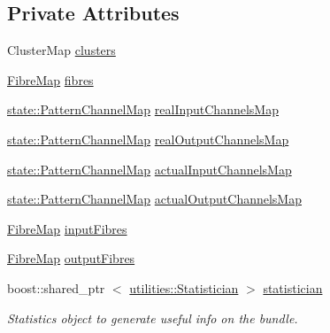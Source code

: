 \subsection*{\-Private \-Attributes}
\begin{DoxyCompactItemize}
\item 
\-Cluster\-Map \hyperlink{classcryomesh_1_1structures_1_1Bundle_a35a36d3305706f597f4c586fcd9f74b7}{clusters}
\item 
\hyperlink{classcryomesh_1_1structures_1_1FibreMap}{\-Fibre\-Map} \hyperlink{classcryomesh_1_1structures_1_1Bundle_a71b3308a867169b8e9af9ab71b8bdf98}{fibres}
\item 
\hyperlink{classcryomesh_1_1state_1_1PatternChannelMap}{state\-::\-Pattern\-Channel\-Map} \hyperlink{classcryomesh_1_1structures_1_1Bundle_ac9bd1c696001ef8acb7291a5f9e81c8b}{real\-Input\-Channels\-Map}
\item 
\hyperlink{classcryomesh_1_1state_1_1PatternChannelMap}{state\-::\-Pattern\-Channel\-Map} \hyperlink{classcryomesh_1_1structures_1_1Bundle_a4043d8bfeb8b066418029864f51d92de}{real\-Output\-Channels\-Map}
\item 
\hyperlink{classcryomesh_1_1state_1_1PatternChannelMap}{state\-::\-Pattern\-Channel\-Map} \hyperlink{classcryomesh_1_1structures_1_1Bundle_ae20b2f9819708971357148dd024db00d}{actual\-Input\-Channels\-Map}
\item 
\hyperlink{classcryomesh_1_1state_1_1PatternChannelMap}{state\-::\-Pattern\-Channel\-Map} \hyperlink{classcryomesh_1_1structures_1_1Bundle_ac67a6d7b29b37b8927c93350e8bcf6e5}{actual\-Output\-Channels\-Map}
\item 
\hyperlink{classcryomesh_1_1structures_1_1FibreMap}{\-Fibre\-Map} \hyperlink{classcryomesh_1_1structures_1_1Bundle_aa6a461295021bdfb4ef4cab0f136a2c1}{input\-Fibres}
\item 
\hyperlink{classcryomesh_1_1structures_1_1FibreMap}{\-Fibre\-Map} \hyperlink{classcryomesh_1_1structures_1_1Bundle_aa671193358b7aba173e45574def3d4c1}{output\-Fibres}
\item 
boost\-::shared\-\_\-ptr\*
$<$ \hyperlink{classcryomesh_1_1utilities_1_1Statistician}{utilities\-::\-Statistician} $>$ \hyperlink{classcryomesh_1_1structures_1_1Bundle_ad505cbda03b4e78399fd3a9568d79708}{statistician}
\begin{DoxyCompactList}\small\item\em \-Statistics object to generate useful info on the bundle. \end{DoxyCompactList}\item 

\end{DoxyCompactItemize}

